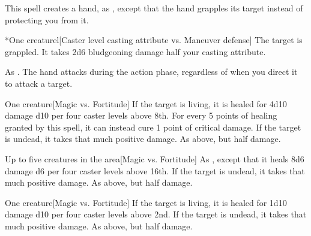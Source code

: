 \spellrng{\rngmed}
\spelldur{\durshort \dismissable}
\spellline
\spelleffect This spell creates a hand, as , except that the hand grapples its target instead of protecting you from it.
\begin{spelltarget}*{One creature}l[Caster level \add casting attribute vs. Maneuver defense]
    \spellsuccess The target is grappled. It takes 2d6 bludgeoning damage \add half your casting attribute.
\end{spelltarget}
\spellnotes As . The hand attacks during the action phase, regardless of when you direct it to attack a target.

\spellrng{\rngclose}
\begin{spelltarget}{One creature}[Magic vs. Fortitude]
    \spelleffect If the target is living, it is healed for 4d10 damage \add d10 per four caster levels above 8th. For every 5 points of healing granted by this spell, it can instead cure 1 point of critical damage.
    \spellsuccess If the target is undead, it takes that much positive damage.
    \spellfailure As above, but half damage.
\end{spelltarget}

\spellrng{\rngclose}
\begin{spelltargets}{Up to five creatures in the area}[Magic vs. Fortitude]
    \spelleffect As , except that it heals 8d6 damage \add d6 per four caster levels above 16th.
    \spellsuccess If the target is undead, it takes that much positive damage.
    \spellfailure As above, but half damage.
\end{spelltargets}

\spellrng{\rngclose}
\begin{spelltarget}{One creature}[Magic vs. Fortitude]
    \spelleffect If the target is living, it is healed for 1d10 damage \add d10 per four caster levels above 2nd.
    \spellsuccess If the target is undead, it takes that much positive damage.
    \spellfailure As above, but half damage.
\end{spelltarget}

